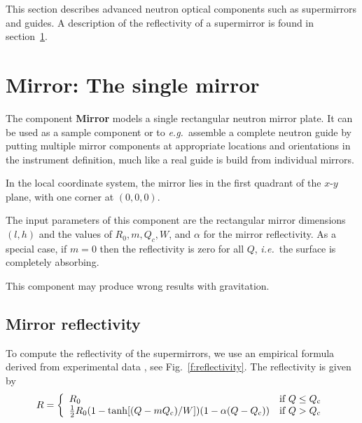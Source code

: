 

This section describes advanced neutron optical
components such as supermirrors and guides.
A description of the reflectivity of a supermirror is found
in section~\ref{s:mirror}.

\section{Mirror: The single mirror}
\label{s:mirror}

The component {\bf Mirror}
models a single rectangular neutron mirror plate. It can be used
as a sample component or to \textit{e.g.}~assemble a complete neutron guide by putting multiple
mirror components at appropriate locations and orientations in the
instrument definition, much like a real guide is build from individual
mirrors.

In the local coordinate system, the mirror lies in the first quadrant of the
$x$-$y$ plane, with one corner at $(0,0,0)$.

The input parameters of this component are
the rectangular mirror dimensions $(l, h)$
and the values of $R_0, m, Q_c, W$, and $\alpha$ for the mirror reflectivity.
As a special case, if $m=0$ then the reflectivity is zero for all $Q$,
\textit{i.e.}\ the surface is completely absorbing.

This component may produce wrong results with gravitation.

\subsection{Mirror reflectivity}
\label{ss:mirrorreflect}
To compute the reflectivity of the supermirrors, we use an empirical
formula derived from experimental data \cite{pb_241_50},
see Fig.~\ref{f:reflectivity}. The reflectivity is given by
\begin{equation} \label{e:Rmirror}
  R = \left\{
    \begin{array}{ll}
      R_0 & \textrm{if $Q \leq Q_{\rm c}$} \\
      \frac{1}{2}R_0(1 - \tanh[(Q - m Q_{\rm c})/W])(1-\alpha(Q-Q_{\rm c}))
         & \textrm{if $Q > Q_{\rm c}$}
    \end{array}
  \right.
\end{equation}

